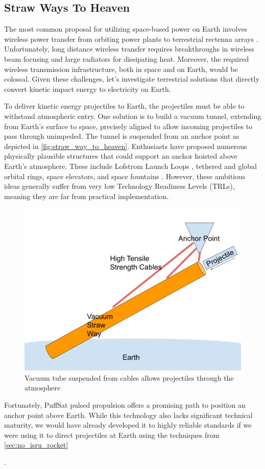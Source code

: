 \documentclass{article}
\begin{document}
{\subsection{Straw Ways To Heaven}\label{sec:straw_way_to_heaven}
The most common proposal for utilizing space-based power on Earth involves wireless power transfer from orbiting power plants to terrestrial rectenna arrays \cite{malaviya2022comprehensive}.  Unfortunately, long distance wireless transfer requires breakthroughs in wireless beam focusing \cite{space_beaming_power} and large radiators for dissipating heat. Moreover, the required wireless transmission infrastructure, both in space and on Earth, would be colossal.  Given these challenges, let's investigate terrestrial solutions that directly convert kinetic impact energy to electricity on Earth.

To deliver kinetic energy projectiles to Earth, the projectiles must be able to withstand atmospheric entry.  One solution is to build a vacuum tunnel, extending from Earth's surface to space, precisely aligned to allow incoming projectiles to pass through unimpeded.  The tunnel is suspended from an anchor point as depicted in \autoref{fig:straw_way_to_heaven}.   Enthusiasts have proposed numerous physically plausible structures that could support an anchor hoisted above Earth's atmosphere. These include Lofstrom Launch Loops \cite {lofstrom_loop}, tethered and global orbital rings, space elevators, and space fountains \cite{isaac_arthur_megastructure_complation}.  However, these ambitious ideas generally suffer from very low Technology Readiness Levels (TRLs), meaning they are far from practical implementation.

\begin{figure}[htpb]
    \centering
    \includegraphics[width=0.5\linewidth]{images/Straw Way To Heaven.png}
    \caption{Vacuum tube suspended from cables allows projectiles through the atmosphere}
    \label{fig:straw_way_to_heaven}
\end{figure}


Fortunately, PuffSat pulsed propulsion offers a promising path to position an anchor point above Earth. While this technology also lacks significant technical maturity, we would have already developed it to highly reliable standards if we were using it to direct projectiles at Earth using the techniques from \autoref{sec:no_isru_rocket}}.  
\end{document}
